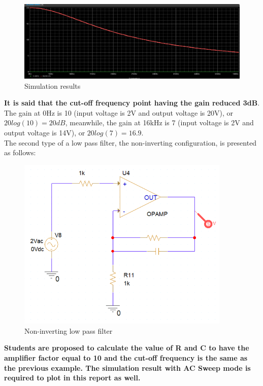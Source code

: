 \begin{figure}[!htp]
    \centering
    \includegraphics[width = 5in]{source/picture/bai_5/low_filter4.PNG}
    \caption{Simulation results}
    \label{lab05_low_filter4}
\end{figure}

\textbf{It is said that the cut-off frequency point having the gain reduced 3dB}. The gain at 0Hz is 10 (input voltage is 2V and output voltage is 20V), or $20log(10) = 20dB$, meanwhile, the gain at 16kHz is 7 (input voltage is 2V and output voltage is 14V), or $20log(7) = 16.9$. \\

The second type of a low pass filter, the non-inverting configuration, is presented as follows:

\begin{figure}[!htp]
    \centering
    \includegraphics[width = 4in]{source/picture/bai_5/low_filter5.PNG}
    \caption{Non-inverting low pass filter}
    \label{lab05_low_filter5}
\end{figure}

\textbf{Students are proposed to calculate the value of R and C to have the amplifier factor equal to 10 and the cut-off frequency is the same as the previous example. The simulation result with AC Sweep mode is required to plot in this report as well.}

